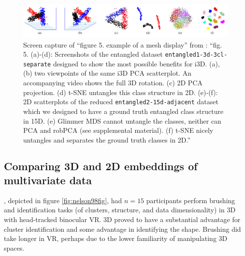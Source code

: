 \documentclass{monashthesis}
\begin{document}
\begin{figure}

{\centering \includegraphics[width=1\linewidth]{./figures/sedlmair13fig} 

}

\caption{Screen capture of ``figure 5. example of a mesh
display'' from \textcite{sedlmair_empirical_2013}: ``fig. 5. (a)-(d):
Screenshots of the entangled dataset \texttt{entangled1-3d-3cl-separate}
designed to show the most possible benefits for i3D. (a),(b) two
viewpoints of the same i3D PCA scatterplot. An accompanying video shows
the full 3D rotation. (c) 2D PCA projection. (d) t-SNE untangles this
class structure in 2D. (e)-(f): 2D scatterplots of the reduced
\texttt{entangled2-15d-adjacent} dataset which we designed to have a
ground truth entangled class structure in 15D. (e) Glimmer MDS cannot
untangle the classes, neither can PCA and robPCA (see supplemental
material). (f) t-SNE nicely untangles and separates the ground truth
classes in 2D.''}\label{fig:sedlmair13fig}
\end{figure}

\subsection{Comparing 3D and 2D embeddings of multivariate
data}\label{comparing-3d-and-2d-embeddings-of-multivariate-data}

\textcite{nelson_xgobi_1998}, depicted in figure \ref{fig:nelson98fig},
had \(n=15\) participants perform brushing and identification tasks (of
clusters, structure, and data dimensionality) in 3D with head-tracked
binocular VR. 3D proved to have a substantial advantage for cluster
identification and some advantage in identifying the shape. Brushing did
take longer in VR, perhaps due to the lower familiarity of manipulating
3D spaces.
\end{document}
